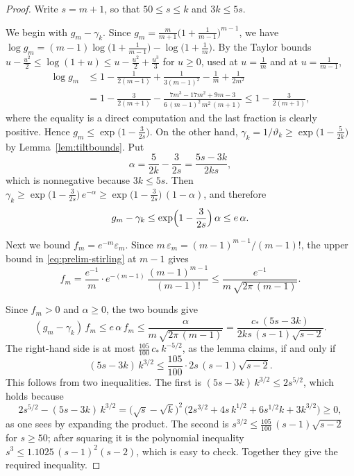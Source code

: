 \documentclass{amsart}
\makeatletter
\theoremstyle{definition}
\theoremstyle{remark}
\numberwithin{equation}{section}
\def\subsection{\@startsection{subsection}{2}\z@{.5\linespacing\@plus.7\linespacing}{-.5em}{\normalfont\bfseries\boldmath}}
\makeatother
\begin{document}
\begin{proof}
Write $s=m+1$, so that $50\le s\le k$ and $3k\le 5s$.

We begin with $g_m-\gamma_k$. Since $g_m=\frac{m}{m+1}\bigl(1+\frac{1}{m-1}\bigr)^{m-1}$, we have $\log g_m=(m-1)\log\bigl(1+\frac{1}{m-1}\bigr)-\log\bigl(1+\frac1m\bigr)$. By the Taylor bounds $u-\frac{u^2}{2}\le\log(1+u)\le u-\frac{u^2}{2}+\frac{u^3}{3}$ for $u\ge 0$, used at $u=\frac1m$ and at $u=\frac{1}{m-1}$,
\begin{align*}
\log g_m&\le 1-\frac{1}{2(m-1)}+\frac{1}{3(m-1)^2}-\frac1m+\frac{1}{2m^2}\\
&=1-\frac{3}{2(m+1)}-\frac{7m^3-17m^2+9m-3}{6\,(m-1)^2\,m^2\,(m+1)}\le 1-\frac{3}{2(m+1)},
\end{align*}
where the equality is a direct computation and the last fraction is clearly positive. Hence $g_m\le\exp\bigl(1-\frac{3}{2s}\bigr)$. On the other hand, $\gamma_k=1/\vartheta_k\ge\exp\bigl(1-\frac{5}{2k}\bigr)$ by Lemma~\ref{lem:tiltbounds}. Put
\[
\alpha=\frac{5}{2k}-\frac{3}{2s}=\frac{5s-3k}{2ks},
\]
which is nonnegative because $3k\le 5s$. Then $\gamma_k\ge\exp\bigl(1-\frac{3}{2s}\bigr)\,e^{-\alpha}\ge\exp\bigl(1-\frac{3}{2s}\bigr)\,(1-\alpha)$, and therefore
\[
g_m-\gamma_k\le\exp\Bigl(1-\frac{3}{2s}\Bigr)\,\alpha\le e\,\alpha .
\]

Next we bound $f_m=e^{-m}\varepsilon_m$. Since $m\,\varepsilon_m=(m-1)^{m-1}/(m-1)!$, the upper bound in \eqref{eq:prelim-stirling} at $m-1$ gives
\[
f_m=\frac{e^{-1}}{m}\cdot e^{-(m-1)}\,\frac{(m-1)^{m-1}}{(m-1)!}\le\frac{e^{-1}}{m\,\sqrt{2\pi\,(m-1)}}.
\]

Since $f_m>0$ and $\alpha\ge 0$, the two bounds give
\[
(g_m-\gamma_k)\,f_m\le e\,\alpha\,f_m\le\frac{\alpha}{m\,\sqrt{2\pi\,(m-1)}}=\frac{c_\ast\,(5s-3k)}{2ks\,(s-1)\sqrt{s-2}}.
\]
The right-hand side is at most $\frac{105}{100}\,c_\ast\,k^{-5/2}$, as the lemma claims, if and only if
\[
(5s-3k)\,k^{3/2}\le\frac{105}{100}\cdot 2s\,(s-1)\sqrt{s-2}.
\]
This follows from two inequalities. The first is $(5s-3k)\,k^{3/2}\le 2s^{5/2}$, which holds because
\[
2s^{5/2}-(5s-3k)\,k^{3/2}=\bigl(\sqrt s-\sqrt k\bigr)^2\,\bigl(2s^{3/2}+4s\,k^{1/2}+6s^{1/2}k+3k^{3/2}\bigr)\ge 0,
\]
as one sees by expanding the product. The second is $s^{3/2}\le\frac{105}{100}\,(s-1)\sqrt{s-2}$ for $s\ge 50$; after squaring it is the polynomial inequality $s^3\le 1.1025\,(s-1)^2(s-2)$, which is easy to check. Together they give the required inequality.
\end{proof}

\subsection{Rows beyond $k+0.47k$}\label{subsec:far-rows}
\end{document}
